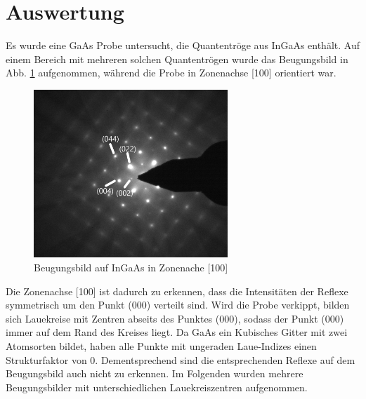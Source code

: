 \documentclass[a4paper,11pt,DIV=11]{scrartcl}
\begin{document}
\section{Auswertung}

Es wurde eine GaAs Probe untersucht, die Quantentröge aus InGaAs enthält. Auf einem Bereich mit mehreren solchen Quantentrögen wurde das Beugungsbild in Abb. \ref{100ind} aufgenommen, während die Probe in Zonenachse [100] orientiert war.

\begin{figure}[h]\centering
	\includegraphics[width=0.65\textwidth]{Versuchsdaten/8/indiziert2.png}
\caption{Beugungsbild auf InGaAs in Zonenache [100]}
\label{100ind}
\end{figure}

Die Zonenachse [100] ist dadurch zu erkennen, dass die Intensitäten der Reflexe symmetrisch um den Punkt (000) verteilt sind. Wird die Probe verkippt, bilden sich Lauekreise mit Zentren abseits des Punktes (000), sodass der Punkt (000) immer auf dem Rand des Kreises liegt. Da GaAs ein Kubisches Gitter mit zwei Atomsorten bildet, haben alle Punkte mit ungeraden Laue-Indizes einen Strukturfaktor von 0. Dementsprechend sind die entsprechenden Reflexe auf dem Beugungsbild auch nicht zu erkennen.
Im Folgenden wurden mehrere Beugungsbilder mit unterschiedlichen Lauekreiszentren aufgenommen.
\end{document}
